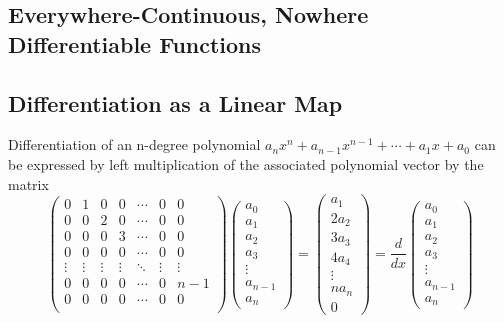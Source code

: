 	\subsection{Everywhere-Continuous, Nowhere Differentiable Functions}

	\subsection{Differentiation as a Linear Map}

	Differentiation of an n-degree polynomial $a_{n}x^{n} + a_{n-1}x^{n-1} + \cdots + a_{1}x +a_{0}$ can be expressed by left multiplication of the associated polynomial vector by the matrix $$\begin{pmatrix}
	0      & 1      & 0      & 0      & \cdots & 0      & 0     \\
	0      & 0      & 2      & 0      & \cdots & 0      & 0     \\
	0      & 0      & 0      & 3      & \cdots & 0      & 0     \\
	0      & 0      & 0      & 0      & \cdots & 0      & 0     \\
	\vdots & \vdots & \vdots & \vdots & \ddots & \vdots & \vdots\\
	0      & 0      & 0      & 0      & \cdots & 0      & n-1   \\
	0      & 0      & 0      & 0      & \cdots & 0      & 0     \\
	\end{pmatrix}
	\begin{pmatrix}
	a_{0}  \\
	a_{1}  \\
	a_{2}  \\
	a_{3}  \\
	\vdots \\
	a_{n-1}\\
	a_{n}
	\end{pmatrix}
	=
	\begin{pmatrix}
	a_{1} \\
	2a_{2}\\
	3a_{3}\\
	4a_{4}\\
	\vdots\\
	na_{n}\\
	0
	\end{pmatrix}
	=
	\frac{d}{dx}
	\begin{pmatrix}
	a_{0}  \\
	a_{1}  \\
	a_{2}  \\
	a_{3}  \\
	\vdots \\
	a_{n-1}\\
	a_{n}
	\end{pmatrix}
	$$

